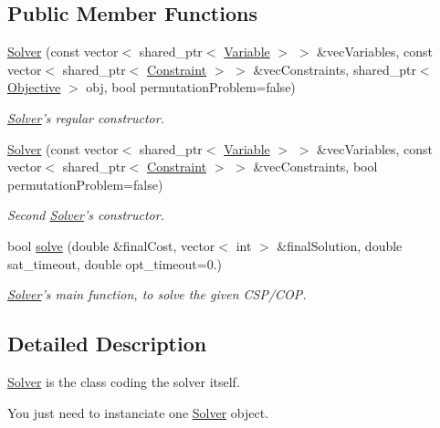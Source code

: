 \subsection*{Public Member Functions}
\begin{DoxyCompactItemize}
\item 
\hyperlink{classghost_1_1Solver_add6b5ac4ab56aa685e70a02c6a56317a}{Solver} (const vector$<$ shared\-\_\-ptr$<$ \hyperlink{classghost_1_1Variable}{Variable} $>$ $>$ \&vec\-Variables, const vector$<$ shared\-\_\-ptr$<$ \hyperlink{classghost_1_1Constraint}{Constraint} $>$ $>$ \&vec\-Constraints, shared\-\_\-ptr$<$ \hyperlink{classghost_1_1Objective}{Objective} $>$ obj, bool permutation\-Problem=false)
\begin{DoxyCompactList}\small\item\em \hyperlink{classghost_1_1Solver}{Solver}'s regular constructor. \end{DoxyCompactList}\item 
\hyperlink{classghost_1_1Solver_a8d21b70c31b1b2de701599b1794dfc59}{Solver} (const vector$<$ shared\-\_\-ptr$<$ \hyperlink{classghost_1_1Variable}{Variable} $>$ $>$ \&vec\-Variables, const vector$<$ shared\-\_\-ptr$<$ \hyperlink{classghost_1_1Constraint}{Constraint} $>$ $>$ \&vec\-Constraints, bool permutation\-Problem=false)
\begin{DoxyCompactList}\small\item\em Second \hyperlink{classghost_1_1Solver}{Solver}'s constructor. \end{DoxyCompactList}\item 
bool \hyperlink{classghost_1_1Solver_acc72c5a651e888858c10dfe300d96fa8}{solve} (double \&final\-Cost, vector$<$ int $>$ \&final\-Solution, double sat\-\_\-timeout, double opt\-\_\-timeout=0.)
\begin{DoxyCompactList}\small\item\em \hyperlink{classghost_1_1Solver}{Solver}'s main function, to solve the given C\-S\-P/\-C\-O\-P. \end{DoxyCompactList}\end{DoxyCompactItemize}


\subsection{Detailed Description}
\hyperlink{classghost_1_1Solver}{Solver} is the class coding the solver itself. 

You just need to instanciate one \hyperlink{classghost_1_1Solver}{Solver} object.

